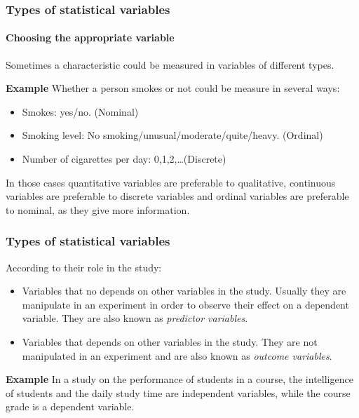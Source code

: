 \begin{frame}
\frametitle{Types of statistical variables}
\framesubtitle{Choosing the appropriate variable}
Sometimes a characteristic could be measured in variables of different types. 

\textbf{Example} Whether a person smokes or not could be measure in several ways: 
\begin{itemize}
\item Smokes: yes/no. (Nominal) 
\item Smoking level: No smoking/unusual/moderate/quite/heavy. (Ordinal)
\item Number of cigarettes per day: 0,1,2,\ldots (Discrete) 
\end{itemize} 

In those cases quantitative variables are preferable to qualitative, continuous variables are preferable to discrete
variables and ordinal variables are preferable to nominal, as they give more information. 

\begin{center}
\scalebox{1}{} 
\end{center}
\end{frame}


\begin{frame}
\frametitle{Types of statistical variables}
According to their role in the study:
\begin{itemize}
\item {} Variables that no depends on other variables in the study. 
Usually they are manipulate in an experiment in order to observe their effect on a dependent variable.
They are also known as \emph{predictor variables}. 
\item {} Variables that depends on other variables in the study.
They are not manipulated in an experiment and are also known as \emph{outcome variables}. 
\end{itemize}

\textbf{Example} In a study on the performance of students in a course, the intelligence of students and the daily
study time are independent variables, while the course grade is a dependent variable. 
\end{frame}


